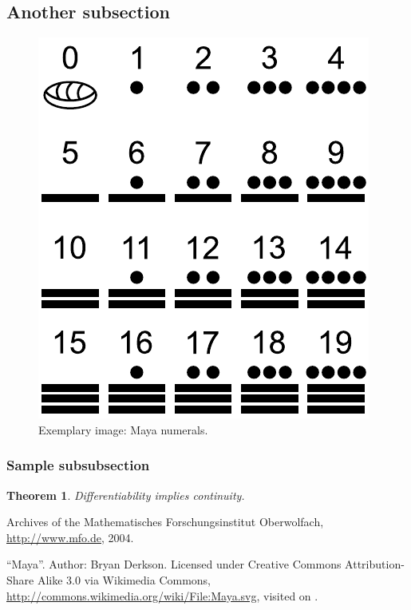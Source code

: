 \documentclass{snapshotmfo}
\begin{document}
\subsection{Another subsection} \label{subsec.another}

\begin{figure}[ht]
	\centering
	\includegraphics[width= 0.33 \textwidth]{maya.pdf}
	\caption{Exemplary image: Maya numerals.}
	\label{fig.maya}
\end{figure}

\subsubsection{Sample subsubsection} \label{subsubsec.sample}

\newtheorem{theorem}{Theorem}
\begin{theorem}\label{thm.continuity}
	Differentiability implies continuity.
\end{theorem}



\begin{imagecredits}
	\item[\Cref{fig.Institute}] Archives of the Mathematisches Forschungsinstitut Oberwolfach,\\\url{http://www.mfo.de}, 2004.
	\item[\Cref{fig.maya}] ``Maya''. Author: Bryan Derkson. Licensed under Creative Commons Attribution-Share Alike 3.0 via Wikimedia Commons, \url{http://commons.wikimedia.org/wiki/File:Maya.svg}, visited on .
\end{imagecredits}
\end{document}

